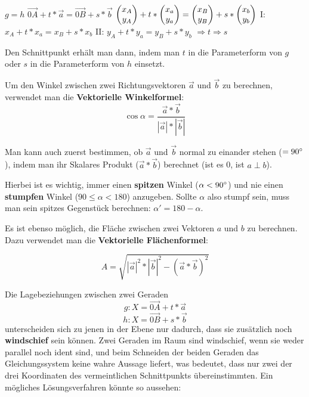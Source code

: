 \begin{itemize}
  \begin{center}
    $g = h$
    \extrapar
    $\vec{0A} + t * \vec{a} = \vec{0B} + s * \vec{b}$
    \extrapar
    $\begin{pmatrix}x_{A}\\y_{A}\end{pmatrix} + t * \begin{pmatrix}x_{a}\\y_{a}\end{pmatrix} = \begin{pmatrix}x_{B}\\y_{B}\end{pmatrix} + s * \begin{pmatrix}x_{b}\\y_{b}\end{pmatrix}$
    \extrapar
    I: $x_{A} + t * x_{a} = x_{B} + s * x_{b}$
    \extrapar
    II: $y_{A} + t * y_{a} = y_{B} + s * y_{b}$
    \extrapar
    $\Rightarrow t \Rightarrow s$
  \end{center}

  Den Schnittpunkt erh\"{a}lt man dann, indem man $t$ in die Parameterform von $g$ oder $s$ in die Parameterform von $h$ einsetzt.

\end{itemize}

\pagebreak


Um den Winkel zwischen zwei Richtungsvektoren $\vec{a}$ und $\vec{b}$ zu berechnen, verwendet man die \textbf{Vektorielle Winkelformel}:
$$ \cos \alpha = \frac{\vec{a} * \vec{b}}{|\vec{a}| * |\vec{b}|}$$

Man kann auch zuerst bestimmen, ob $\vec{a}$ und $\vec{b}$ normal zu einander stehen ($= 90\degree$), indem man ihr Skalares Produkt ($\vec{a} * \vec{b}$) berechnet (ist es 0, ist $a \perp b$).

Hierbei ist es wichtig, immer einen \textbf{spitzen} Winkel ($\alpha < 90\degree$) und nie einen \textbf{stumpfen} Winkel ($90 \leq \alpha < 180$) anzugeben. Sollte $\alpha$ also stumpf sein, muss man sein spitzes Gegenst\"{u}ck berechnen: $\alpha{}' = 180 - \alpha$.


Es ist ebenso m\"{o}glich, die Fl\"{a}che zwischen zwei Vektoren $a$ und $b$ zu berechnen. Dazu verwendet man die \textbf{Vektorielle Fl\"{a}chenformel}:

$$ A = \sqrt{{|\vec{a}|}^2 * {|\vec{b}|}^2 - {(\vec{a} * \vec{b})}^2}$$

\pagebreak


Die Lagebeziehungen zwischen zwei Geraden $$g: X = \vec{0A} + t * \vec{a}$$ $$h: X = \vec{0B} + s * \vec{b}$$ unterscheiden sich zu jenen in der Ebene nur dadurch, dass sie zus\"{a}tzlich noch \textbf{windschief} sein k\"{o}nnen. Zwei Geraden im Raum sind windschief, wenn sie weder parallel noch ident sind, und beim Schneiden der beiden Geraden das Gleichungssystem keine wahre Aussage liefert, was bedeutet, dass nur zwei der drei Koordinaten des vermeintlichen Schnittpunkts \"{u}bereinstimmten. Ein m\"{o}gliches L\"{o}sungsverfahren k\"{o}nnte so aussehen:

